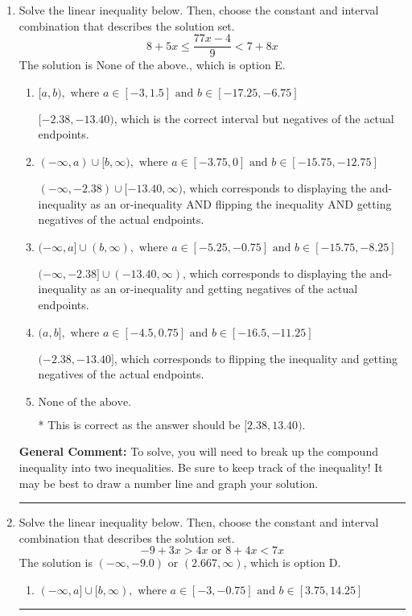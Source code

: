 \documentclass{extbook}[14pt]
\newcommand{\litem}[1]{\item #1

\rule{\textwidth}{0.4pt}}
\begin{document}
\begin{enumerate}
{\begin{enumerate}[label=\Alph*.]
 $(1.8, \infty)$, which corresponds to switching the direction of the interval. You likely did this if you did not flip the inequality when dividing by a negative!
\item \( \text{None of the above}. \)

You may have chosen this if you thought the inequality did not match the ends of the intervals.
\end{enumerate}

\textbf{General Comment:} Remember that less/greater than or equal to includes the endpoint, while less/greater do not. Also, remember that you need to flip the inequality when you multiply or divide by a negative.
}
\litem{
Solve the linear inequality below. Then, choose the constant and interval combination that describes the solution set.
\[ 8 + 5 x \leq \frac{77 x - 4}{9} < 7 + 8 x \]The solution is \( \text{None of the above.} \), which is option E.\begin{enumerate}[label=\Alph*.]
\item \( [a, b), \text{ where } a \in [-3, 1.5] \text{ and } b \in [-17.25, -6.75] \)

$[-2.38, -13.40)$, which is the correct interval but negatives of the actual endpoints.
\item \( (-\infty, a) \cup [b, \infty), \text{ where } a \in [-3.75, 0] \text{ and } b \in [-15.75, -12.75] \)

$(-\infty, -2.38) \cup [-13.40, \infty)$, which corresponds to displaying the and-inequality as an or-inequality AND flipping the inequality AND getting negatives of the actual endpoints.
\item \( (-\infty, a] \cup (b, \infty), \text{ where } a \in [-5.25, -0.75] \text{ and } b \in [-15.75, -8.25] \)

$(-\infty, -2.38] \cup (-13.40, \infty)$, which corresponds to displaying the and-inequality as an or-inequality and getting negatives of the actual endpoints.
\item \( (a, b], \text{ where } a \in [-4.5, 0.75] \text{ and } b \in [-16.5, -11.25] \)

$(-2.38, -13.40]$, which corresponds to flipping the inequality and getting negatives of the actual endpoints.
\item \( \text{None of the above.} \)

* This is correct as the answer should be $[2.38, 13.40)$.
\end{enumerate}

\textbf{General Comment:} To solve, you will need to break up the compound inequality into two inequalities. Be sure to keep track of the inequality! It may be best to draw a number line and graph your solution.
}
\litem{
Solve the linear inequality below. Then, choose the constant and interval combination that describes the solution set.
\[ -9 + 3 x > 4 x \text{ or } 8 + 4 x < 7 x \]The solution is \( (-\infty, -9.0) \text{ or } (2.667, \infty) \), which is option D.\begin{enumerate}[label=\Alph*.]
\item \( (-\infty, a] \cup [b, \infty), \text{ where } a \in [-3, -0.75] \text{ and } b \in [3.75, 14.25] \)


\end{enumerate}}
\end{enumerate}
\end{document}
